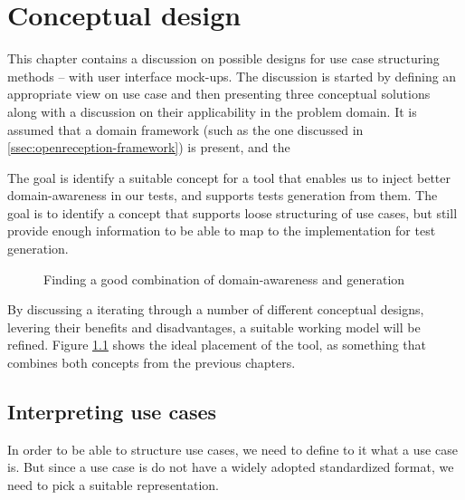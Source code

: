 \chapter{Conceptual design}
\label{chap:conceptual_design}
This chapter contains a discussion on possible designs for use case structuring methods -- with user interface mock-ups. The discussion is started by defining an appropriate view on use case and then presenting three conceptual solutions along with a discussion on their applicability in the problem domain. It is assumed that a domain framework (such as the one discussed in \ref{ssec:openreception-framework}) is present, and the \medskip

\noindent The goal is identify a suitable concept for a tool that enables us to inject better domain-awareness in our tests, and supports tests generation from them. The goal is to identify a concept that supports loose structuring of use cases, but still provide enough information to be able to map to the implementation for test generation.\medskip
\begin{figure}[!htbp]
\centering

\caption{Finding a good combination of domain-awareness and generation}
\label{fig:project_parameter_plot_project}
\end{figure}

\noindent By discussing a iterating through a number of different conceptual designs, levering their benefits and disadvantages, a suitable  working model will be refined. Figure \ref{fig:project_parameter_plot_project} shows the ideal placement of the tool, as something that combines both concepts from the previous chapters.

\section{Interpreting use cases}
In order to be able to structure use cases, we need to define to it what a use case is. But since a use case is do not have a widely adopted standardized format, we need to pick a suitable representation.\medskip

